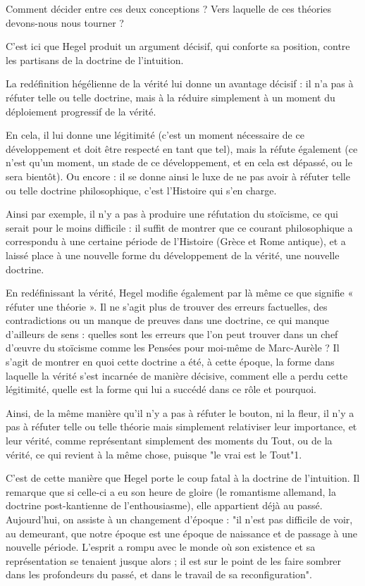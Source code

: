 Comment décider entre ces deux conceptions ? Vers laquelle de ces théories devons-nous nous tourner ?

C’est ici que Hegel produit un argument décisif, qui conforte sa position, contre les partisans de la doctrine de l’intuition.

La redéfinition hégélienne de la vérité lui donne un avantage décisif : il n’a pas à réfuter telle ou telle doctrine, mais à la réduire simplement à un moment du déploiement progressif de la vérité.

En cela, il lui donne une légitimité (c’est un moment nécessaire de ce développement et doit être respecté en tant que tel), mais la réfute également (ce n’est qu’un moment, un stade de ce développement, et en cela est dépassé, ou le sera bientôt). Ou encore : il se donne ainsi le luxe de ne pas avoir à réfuter telle ou telle doctrine philosophique, c’est l’Histoire qui s’en charge.

Ainsi par exemple, il n’y a pas à produire une réfutation du stoïcisme, ce qui serait pour le moins difficile : il suffit de montrer que ce courant philosophique a correspondu à une certaine période de l’Histoire (Grèce et Rome antique), et a laissé place à une nouvelle forme du développement de la vérité, une nouvelle doctrine.

En redéfinissant la vérité, Hegel modifie également par là même ce que signifie « réfuter une théorie ». Il ne s’agit plus de trouver des erreurs factuelles, des contradictions ou un manque de preuves dans une doctrine, ce qui manque d’ailleurs de sens : quelles sont les erreurs que l’on peut trouver dans un chef d’œuvre du stoïcisme comme les Pensées pour moi-même de Marc-Aurèle ? Il s’agit de montrer en quoi cette doctrine a été, à cette époque, la forme dans laquelle la vérité s’est incarnée de manière décisive, comment elle a perdu cette légitimité, quelle est la forme qui lui a succédé dans ce rôle et pourquoi.

Ainsi, de la même manière qu’il n’y a pas à réfuter le bouton, ni la fleur, il n’y a pas à réfuter telle ou telle théorie mais simplement relativiser leur importance, et leur vérité, comme représentant simplement des moments du Tout, ou de la vérité, ce qui revient à la même chose, puisque "le vrai est le Tout"1.

C’est de cette manière que Hegel porte le coup fatal à la doctrine de l’intuition. Il remarque que si celle-ci a eu son heure de gloire (le romantisme allemand, la doctrine post-kantienne de l’enthousiasme), elle appartient déjà au passé. Aujourd’hui, on assiste à un changement d’époque : "il n’est pas difficile de voir, au demeurant, que notre époque est une époque de naissance et de passage à une nouvelle période. L’esprit a rompu avec le monde où son existence et sa représentation se tenaient jusque alors ; il est sur le point de les faire sombrer dans les profondeurs du passé, et dans le travail de sa reconfiguration".

